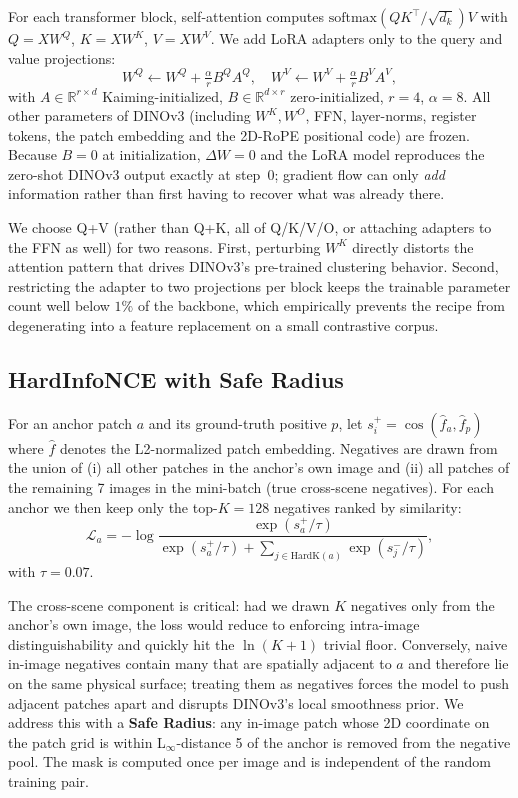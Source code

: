 \documentclass[10pt,twocolumn,letterpaper]{article}
\begin{document}
For each transformer block, self-attention computes
$\text{softmax}(QK^\top / \sqrt{d_k}) V$ with
$Q = X W^Q$, $K = X W^K$, $V = X W^V$. We add LoRA adapters only to the
query and value projections:
\begin{equation}
W^Q \!\leftarrow\! W^Q + \tfrac{\alpha}{r} B^Q A^Q,\quad
W^V \!\leftarrow\! W^V + \tfrac{\alpha}{r} B^V A^V,
\end{equation}
with $A \in \mathbb{R}^{r\times d}$ Kaiming-initialized,
$B \in \mathbb{R}^{d\times r}$ zero-initialized,
$r=4$, $\alpha=8$. All other parameters of DINOv3 (including
$W^K, W^O$, FFN, layer-norms, register tokens, the patch embedding
and the 2D-RoPE positional code) are frozen. Because $B=0$ at
initialization, $\Delta W = 0$ and the LoRA model reproduces the
zero-shot DINOv3 output exactly at step~$0$; gradient flow can only
\emph{add} information rather than first having to recover what was
already there.

We choose Q+V (rather than Q+K, all of Q/K/V/O, or attaching adapters
to the FFN as well) for two reasons. First, perturbing $W^K$ directly
distorts the attention pattern that drives DINOv3's pre-trained
clustering behavior. Second, restricting the adapter to two
projections per block keeps the trainable parameter count well below
$1\%$ of the backbone, which empirically prevents the recipe from
degenerating into a feature replacement on a small contrastive corpus.

\subsection{HardInfoNCE with Safe Radius}

For an anchor patch $a$ and its ground-truth positive $p$, let $s_i^+ =
\cos(\hat f_a, \hat f_p)$ where $\hat f$ denotes the L2-normalized
patch embedding. Negatives are drawn from the union of (i) all other
patches in the anchor's own image and (ii) all patches of the
remaining 7 images in the mini-batch (true cross-scene negatives). For
each anchor we then keep only the top-$K=128$ negatives ranked by
similarity:
\begin{equation}
\mathcal{L}_a = -\log\frac{\exp(s_a^+/\tau)}{\exp(s_a^+/\tau) +
\sum_{j\in\mathrm{HardK}(a)} \exp(s_j^-/\tau)},
\end{equation}
with $\tau = 0.07$.

The cross-scene component is critical: had we drawn $K$ negatives only
from the anchor's own image, the loss would reduce to enforcing
intra-image distinguishability and quickly hit the
$\ln(K\!+\!1)$ trivial floor. Conversely, naive in-image negatives
contain many that are spatially adjacent to $a$ and therefore lie on
the same physical surface; treating them as negatives forces the model
to push adjacent patches apart and disrupts DINOv3's local smoothness
prior. We address this with a \textbf{Safe Radius}: any in-image
patch whose 2D coordinate on the patch grid is within
L$_\infty$-distance 5 of the anchor is removed from the negative pool.
The mask is computed once per image and is independent of the random
training pair.
\end{document}
